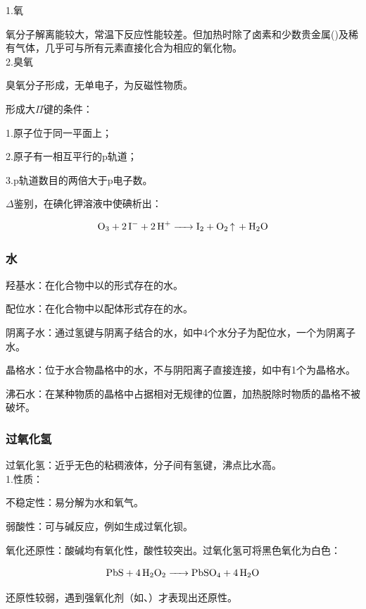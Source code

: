 \documentclass[a4paper,UTF8]{article}
\begin{document}
1.氧

氧分子解离能较大，常温下反应性能较差。但加热时除了卤素和少数贵金属()及稀有气体，几乎可与所有元素直接化合为相应的氧化物。\\

2.臭氧

臭氧分子形成，无单电子，为反磁性物质。

\begin{tcolorbox}

形成大$\Pi$键的条件：

1.原子位于同一平面上；

2.原子有一相互平行的p轨道；

3.p轨道数目的两倍大于p电子数。

\end{tcolorbox}

$\Delta$鉴别，在碘化钾溶液中使碘析出：

$$ \ce{O3 + 2I- + 2H+ -> I2 + O2 ^ + H2O} $$

\subsubsection{水}

羟基水：在化合物中以的形式存在的水。

配位水：在化合物中以配体形式存在的水。

阴离子水：通过氢键与阴离子结合的水，如中4个水分子为配位水，一个为阴离子水。

晶格水：位于水合物晶格中的水，不与阴阳离子直接连接，如中有1个为晶格水。

沸石水：在某种物质的晶格中占据相对无规律的位置，加热脱除时物质的晶格不被破坏。

\subsubsection{过氧化氢}

过氧化氢：近乎无色的粘稠液体，分子间有氢键，沸点比水高。\\

1.性质：

不稳定性：易分解为水和氧气。

弱酸性：可与碱反应，例如生成过氧化钡。

氧化还原性：酸碱均有氧化性，酸性较突出。过氧化氢可将黑色氧化为白色：

$$ \ce{PbS + 4H2O2 -> PbSO4 + 4H2O} $$

还原性较弱，遇到强氧化剂（如、）才表现出还原性。
\end{document}
